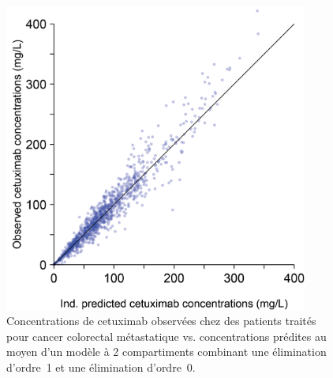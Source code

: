 \begin{figure}[htbp]
	\centering
		\includegraphics[width=10cm]{figures/raster/FIG_20}
	\caption{Concentrations de cetuximab observées chez des patients traités pour cancer colorectal métastatique vs. concentrations prédites au moyen d'un modèle à 2 compartiments combinant une élimination d'ordre~1 et une élimination d'ordre~0.}
	\label{fig:20}
\end{figure}

